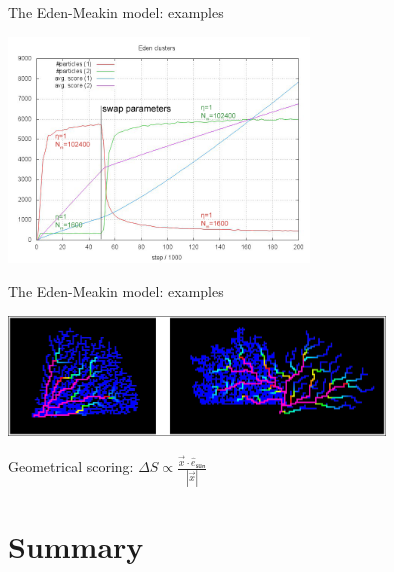 \documentclass[smaller]{beamer}
\begin{document}
            \begin{frame}{The Eden-Meakin model: examples}
                \begin{center}
                    \includegraphics[width=8cm]{img/eden_03.png}
                \end{center}
            \end{frame}

            \begin{frame}{The Eden-Meakin model: examples}
                \begin{center}
                    \includegraphics[width=10cm]{img/eden_04.png}

                    \vspace{1cm}
                    Geometrical scoring: $\Delta S\propto\frac{\vec x\cdot \hat e_\mathsf{sun}}{|\vec x|}$
                \end{center}
            \end{frame}

    \section{Summary}
\end{document}
